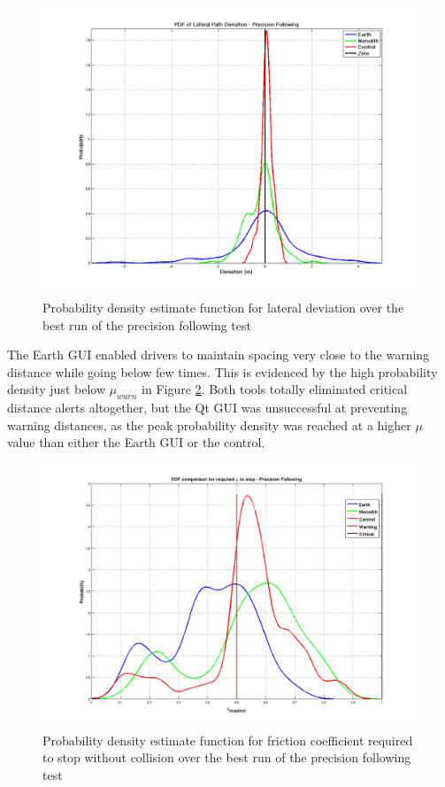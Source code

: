 \documentclass[twocolumn,10pt]{article}
\begin{document}
    \begin{figure}[ht] \centering
      \includegraphics[width=\columnwidth]{../graphics/pdf_precision_following_deviation.png}
      \caption{Probability density estimate function for lateral deviation over the best run of the precision following test}
      \label{fig:pdf_pf_dev}
    \end{figure}

    The Earth GUI enabled drivers to maintain spacing very close to the warning distance while going below few times. This is evidenced by the high probability density just below $\mu_{warn}$ in Figure \ref{fig:pdf_pf_mu}. Both tools totally eliminated critical distance alerts altogether, but the Qt GUI was unsuccessful at preventing warning distances, as the peak probability density was reached at a higher $\mu$ value than either the Earth GUI or the control.
    
    \begin{figure}[ht] \centering
      \includegraphics[width=\columnwidth]{../graphics/precision_following_mu_distribution.png}
      \caption{Probability density estimate function for friction coefficient required to stop without collision over the best run of the precision following test}
      \label{fig:pdf_pf_mu}
    \end{figure}
\end{document}
